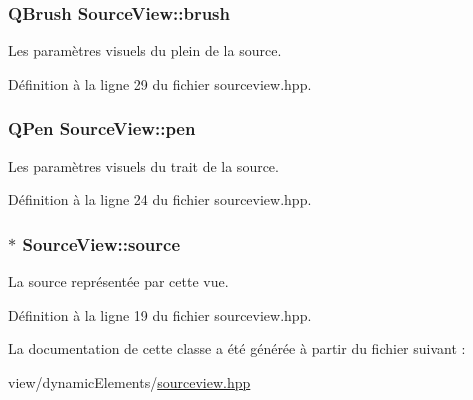 \subsubsection[{brush}]{\setlength{\rightskip}{0pt plus 5cm}Q\+Brush Source\+View\+::brush\hspace{0.3cm}{\ttfamily [private]}}\label{classSourceView_ab1337e79e435bc3310c34acef403d9d2}


Les paramètres visuels du plein de la source. 



Définition à la ligne 29 du fichier sourceview.\+hpp.

\hypertarget{classSourceView_a3f838e39f9e01a2a547b164c28193170}{}
\subsubsection[{pen}]{\setlength{\rightskip}{0pt plus 5cm}Q\+Pen Source\+View\+::pen\hspace{0.3cm}{\ttfamily [private]}}\label{classSourceView_a3f838e39f9e01a2a547b164c28193170}


Les paramètres visuels du trait de la source. 



Définition à la ligne 24 du fichier sourceview.\+hpp.

\hypertarget{classSourceView_a79354c401511132bfe754ce5d92b8d23}{}
\subsubsection[{source}]{$\ast$ Source\+View\+::source\hspace{0.3cm}{\ttfamily [private]}}\label{classSourceView_a79354c401511132bfe754ce5d92b8d23}


La source représentée par cette vue. 



Définition à la ligne 19 du fichier sourceview.\+hpp.



La documentation de cette classe a été générée à partir du fichier suivant \+:\begin{DoxyCompactItemize}
\item 
view/dynamic\+Elements/\hyperlink{sourceview_8hpp}{sourceview.\+hpp}\end{DoxyCompactItemize}
